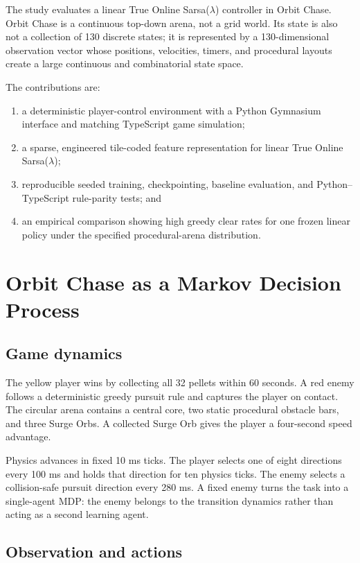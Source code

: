 \documentclass[11pt]{article}
\begin{document}
The study evaluates a linear True Online Sarsa($\lambda$) controller in Orbit
Chase. Orbit Chase is a continuous top-down arena, not a grid world. Its state
is also not a collection of 130 discrete states; it is represented by a
130-dimensional observation vector whose positions, velocities, timers, and
procedural layouts create a large continuous and combinatorial state space.

The contributions are:

\begin{enumerate}[leftmargin=*]
  \item a deterministic player-control environment with a Python Gymnasium
  interface and matching TypeScript game simulation;
  \item a sparse, engineered tile-coded feature representation for linear True
  Online Sarsa($\lambda$);
  \item reproducible seeded training, checkpointing, baseline evaluation, and
  Python--TypeScript rule-parity tests; and
  \item an empirical comparison showing high greedy clear rates for one frozen
  linear policy under the specified procedural-arena distribution.
\end{enumerate}

\section{Orbit Chase as a Markov Decision Process}

\subsection{Game dynamics}

The yellow player wins by collecting all 32 pellets within 60 seconds. A red
enemy follows a deterministic greedy pursuit rule and captures the player on
contact. The circular arena contains a central core, two static procedural
obstacle bars, and three Surge Orbs. A collected Surge Orb gives the player a
four-second speed advantage.

Physics advances in fixed 10 ms ticks. The player selects one of eight
directions every 100 ms and holds that direction for ten physics ticks. The
enemy selects a collision-safe pursuit direction every 280 ms. A fixed enemy
turns the task into a single-agent MDP: the enemy belongs to the transition
dynamics rather than acting as a second learning agent.

\subsection{Observation and actions}
\end{document}
